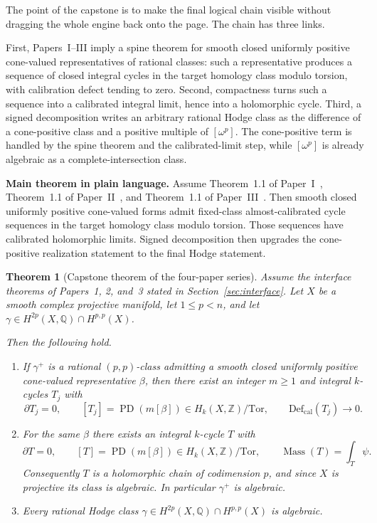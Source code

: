 \documentclass[11pt]{article}
\numberwithin{equation}{section}
\theoremstyle{plain}
\newtheorem{theorem}{Theorem}[section]
\theoremstyle{definition}
\theoremstyle{remark}
\DeclareMathOperator{\Mass}{Mass}
\DeclareMathOperator{\PD}{PD}
\newcommand{\Q}{\mathbb{Q}}
\newcommand{\Z}{\mathbb{Z}}
\newcommand{\Defcal}{\mathrm{Def}_{\mathrm{cal}}}
\newcommand{\Tor}{\mathrm{Tor}}
\begin{document}
The point of the capstone is to make the final logical chain visible without dragging the whole engine back onto the page. The chain has three links.

First, Papers~I--III imply a spine theorem for smooth closed uniformly positive cone-valued representatives of rational classes: such a representative produces a sequence of closed integral cycles in the target homology class modulo torsion, with calibration defect tending to zero. Second, compactness turns such a sequence into a calibrated integral limit, hence into a holomorphic cycle. Third, a signed decomposition writes an arbitrary rational Hodge class as the difference of a cone-positive class and a positive multiple of $[\omega^p]$. The cone-positive term is handled by the spine theorem and the calibrated-limit step, while $[\omega^p]$ is already algebraic as a complete-intersection class.

\medskip

\noindent\textbf{Main theorem in plain language.}
Assume Theorem~1.1 of Paper~I~\cite{Washburn26I}, Theorem~1.1 of Paper~II~\cite{Washburn26II}, and Theorem~1.1 of Paper~III~\cite{Washburn26III}. Then smooth closed uniformly positive cone-valued forms admit fixed-class almost-calibrated cycle sequences in the target homology class modulo torsion. Those sequences have calibrated holomorphic limits. Signed decomposition then upgrades the cone-positive realization statement to the final Hodge statement.

\begin{theorem}[Capstone theorem of the four-paper series]\label{thm:main}
Assume the interface theorems of Papers~1, 2, and~3 stated in Section~\ref{sec:interface}. Let $X$ be a smooth complex projective manifold, let $1\le p<n$, and let $\gamma\in H^{2p}(X,\Q)\cap H^{p,p}(X)$.

Then the following hold.
\begin{enumerate}
\item[\textnormal{(i)}] If $\gamma^+$ is a rational $(p,p)$-class admitting a smooth closed uniformly positive cone-valued representative $\beta$, then there exist an integer $m\ge 1$ and integral $k$-cycles $T_j$ with
\[
\partial T_j=0,
\qquad
[T_j]=\PD(m[\beta])\in H_k(X,\Z)/\Tor,
\qquad
\Defcal(T_j)\longrightarrow 0.
\]
\item[\textnormal{(ii)}] For the same $\beta$ there exists an integral $k$-cycle $T$ with
\[
\partial T=0,
\qquad
[T]=\PD(m[\beta])\in H_k(X,\Z)/\Tor,
\qquad
\Mass(T)=\int_T \psi.
\]
Consequently $T$ is a holomorphic chain of codimension $p$, and since $X$ is projective its class is algebraic. In particular $\gamma^+$ is algebraic.
\item[\textnormal{(iii)}] Every rational Hodge class $\gamma\in H^{2p}(X,\Q)\cap H^{p,p}(X)$ is algebraic.
\end{enumerate}
\end{theorem}
\end{document}
